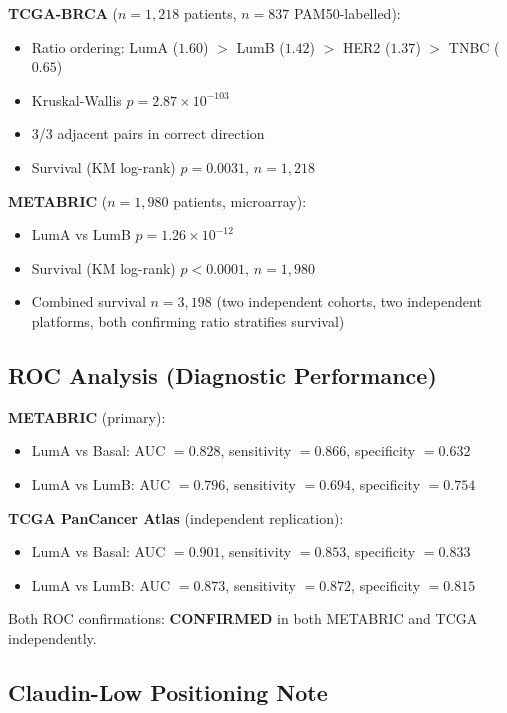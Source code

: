 \documentclass[12pt, a4paper]{article}
\begin{document}
\textbf{TCGA-BRCA} ($n=1{,}218$ patients,
$n=837$ PAM50-labelled):
\begin{itemize}
    \item Ratio ordering: LumA ($1.60$) $>$
    LumB ($1.42$) $>$ HER2 ($1.37$) $>$
    TNBC ($0.65$)
    \item Kruskal-Wallis $p = 2.87\times10^{-103}$
    \item 3/3 adjacent pairs in correct direction
    \item Survival (KM log-rank) $p = 0.0031$,
    $n=1{,}218$
\end{itemize}

\textbf{METABRIC} ($n=1{,}980$ patients,
microarray):
\begin{itemize}
    \item LumA vs LumB $p = 1.26\times10^{-12}$
    \item Survival (KM log-rank) $p < 0.0001$,
    $n=1{,}980$
    \item Combined survival $n=3{,}198$
    (two independent cohorts, two independent
    platforms, both confirming ratio stratifies
    survival)
\end{itemize}

\subsection{ROC Analysis (Diagnostic Performance)}

\textbf{METABRIC} (primary):
\begin{itemize}
    \item LumA vs Basal: AUC $= 0.828$,
    sensitivity $= 0.866$, specificity $= 0.632$
    \item LumA vs LumB: AUC $= 0.796$,
    sensitivity $= 0.694$, specificity $= 0.754$
\end{itemize}

\textbf{TCGA PanCancer Atlas} (independent
replication):
\begin{itemize}
    \item LumA vs Basal: AUC $= 0.901$,
    sensitivity $= 0.853$, specificity $= 0.833$
    \item LumA vs LumB: AUC $= 0.873$,
    sensitivity $= 0.872$, specificity $= 0.815$
\end{itemize}

Both ROC confirmations: \textbf{CONFIRMED}
in both METABRIC and TCGA independently.

\subsection{Claudin-Low Positioning Note}
\end{document}
